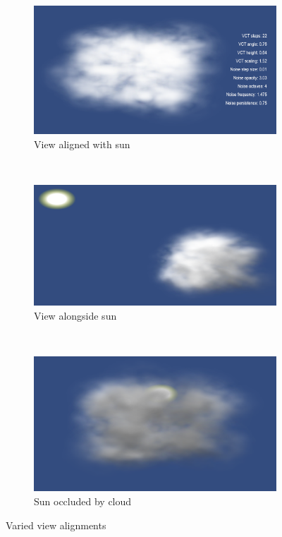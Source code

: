 \begin{figure}[H]
\centering
	\begin{subfigure}[t]{\textwidth}
	\includegraphics[width=\textwidth]{../res/res3.png}
	\caption{View aligned with sun}
	\end{subfigure}
	~
	\begin{subfigure}[t]{\textwidth}
	\includegraphics[width=\textwidth]{../res/res3-1.png}
	\caption{View alongside sun}
	\end{subfigure}
	~
	\begin{subfigure}[t]{\textwidth}
	\includegraphics[width=\textwidth]{../res/res3-2.png}
	\caption{Sun occluded by cloud}
	\end{subfigure}
\caption{Varied view alignments}
\end{figure}

